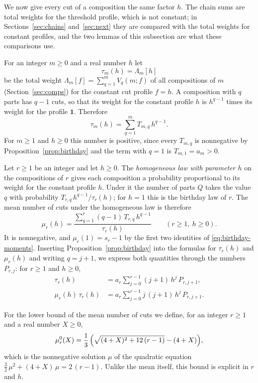 \documentclass{amsart}
\makeatletter
\theoremstyle{definition}
\theoremstyle{remark}
\numberwithin{equation}{section}
\def\subsection{\@startsection{subsection}{2}\z@{.5\linespacing\@plus.7\linespacing}{-.5em}{\normalfont\bfseries\boldmath}}
\makeatother
\begin{document}
\subsection{The homogeneous law}\label{subsec:birthday-homogeneous}

We now give every cut of a composition the same factor $h$. The chain sums are total weights for the threshold profile, which is not constant; in Sections~\ref{sec:chains} and~\ref{sec:next} they are compared with the total weights for constant profiles, and the two lemmas of this subsection are what these comparisons use.

For an integer $m\ge 0$ and a real number $h$ let
\[
\tau_m(h)=\Lambda_m[h]
\]
be the total weight $\Lambda_m[f]=\sum_{q=1}^{m}V_q(m;f)$ of all compositions of $m$ (Section~\ref{sec:comps}) for the constant cut profile $f=h$. A composition with $q$ parts has $q-1$ cuts, so that its weight for the constant profile $h$ is $h^{q-1}$ times its weight for the profile $\mathbf 1$. Therefore
\[
\tau_m(h)=\sum_{q=1}^{m}T_{m,q}\,h^{q-1}.
\]
For $m\ge 1$ and $h\ge 0$ this number is positive, since every $T_{m,q}$ is nonnegative by Proposition~\ref{prop:birthday} and the term with $q=1$ is $T_{m,1}=a_m>0$.

Let $r\ge 1$ be an integer and let $h\ge 0$. The \emph{homogeneous law with parameter $h$} on the compositions of $r$ gives each composition a probability proportional to its weight for the constant profile $h$. Under it the number of parts $Q$ takes the value $q$ with probability $T_{r,q}\,h^{q-1}/\tau_r(h)$; for $h=1$ this is the birthday law of $r$. The mean number of cuts under the homogeneous law is therefore
\[
\mu_r(h)=\frac{\sum_{q=1}^{r}(q-1)\,T_{r,q}\,h^{q-1}}{\tau_r(h)}\qquad(r\ge 1,\ h\ge 0).
\]
It is nonnegative, and $\mu_r(1)=s_r-1$ by the first two identities of \eqref{eq:birthday-moments}. Inserting Proposition~\ref{prop:birthday} into the formulas for $\tau_r(h)$ and $\mu_r(h)$ and writing $q=j+1$, we express both quantities through the numbers $P_{r,j}$: for $r\ge 1$ and $h\ge 0$,
\begin{equation}\label{eq:birthday-cuts}
\begin{aligned}
\tau_r(h)&=a_r\sum_{j=0}^{r-1}(j+1)\,h^{j}\,P_{r,j+1},\\
\mu_r(h)\,\tau_r(h)&=a_r\sum_{j=0}^{r-1}j\,(j+1)\,h^{j}\,P_{r,j+1}.
\end{aligned}
\end{equation}

For the lower bound of the mean number of cuts we define, for an integer $r\ge 1$ and a real number $X\ge 0$,
\[
\mu^0_r(X)=\frac13\,\Bigl(\sqrt{(4+X)^2+12\,(r-1)}-(4+X)\Bigr),
\]
which is the nonnegative solution $\mu$ of the quadratic equation $\frac32\,\mu^2+(4+X)\,\mu=2\,(r-1)$. Unlike the mean itself, this bound is explicit in $r$ and $h$.
\end{document}
